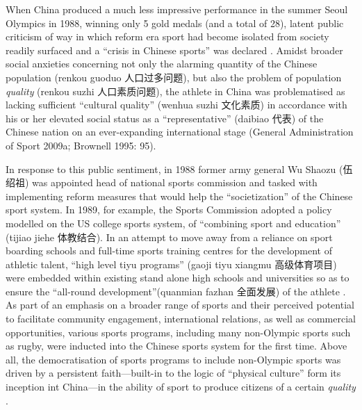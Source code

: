     When China produced a much less impressive performance in the summer Seoul Olympics in 1988, winning only 5 gold medals (and a total of 28), latent public criticism of way in which reform era sport had become isolated from society readily surfaced and a ``crisis in Chinese sports'' was declared \citep[199]{Brownell1995}.  Amidst broader social anxieties concerning not only the alarming quantity of the Chinese population (renkou guoduo 人口过多问题), but also the problem of population \textit{quality} (renkou suzhi 人口素质问题), the athlete in China was problematised as lacking sufficient ``cultural quality'' (wenhua suzhi 文化素质) in accordance with his or her elevated social status as a ``representative'' (daibiao 代表) of the Chinese nation on an ever-expanding international stage (General Administration of Sport 2009a; Brownell 1995: 95).

    In response to this public sentiment, in 1988 former army general Wu Shaozu (伍绍祖) was
    appointed head of national sports commission and tasked with implementing reform measures that would help the ``societization'' of the Chinese sport system. In 1989, for example, the Sports Commission adopted a policy modelled on the US college sports system, of ``combining sport and education'' (tijiao jiehe 体教结合).  In an attempt to move away from a reliance on sport boarding schools and full-time sports training centres for the development of athletic talent, ``high level tiyu programs'' (gaoji tiyu xiangmu 高级体育项目) were embedded within existing stand alone high schools and universities so as to ensure the ``all-round development''(quanmian fazhan 全面发展) of the athlete \citep[203]{Brownell1995}.  As part of an emphasis on a broader range of sports and their perceived potential to facilitate community engagement, international relations, as well as commercial opportunities, various sports programs, including many non-Olympic sports such as rugby, were inducted into the Chinese sports system for the first time\citep[70]{Knuttgen1990}.  Above all, the  democratisation of sports programs to include non-Olympic sports was driven by a persistent faith---built-in to the logic of ``physical culture'' form its inception int China---in the ability of sport to produce citizens of a certain \textit{quality} \citep[7]{Woronov2003}.

